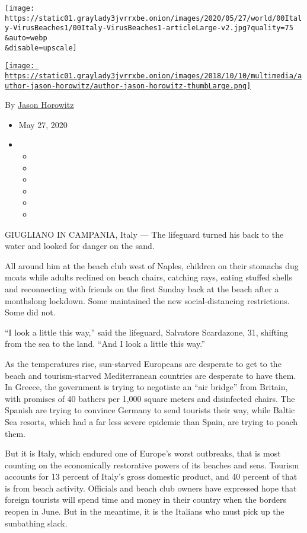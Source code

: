 \texttt{[image: https://static01.graylady3jvrrxbe.onion/images/2020/05/27/world/00Italy-VirusBeaches1/00Italy-VirusBeaches1-articleLarge-v2.jpg?quality=75\\\&auto=webp\\\&disable=upscale]}

\href{https://www.nytimes3xbfgragh.onion/by/jason-horowitz}{\texttt{[image: https://static01.graylady3jvrrxbe.onion/images/2018/10/10/multimedia/author-jason-horowitz/author-jason-horowitz-thumbLarge.png]}}

By \href{https://www.nytimes3xbfgragh.onion/by/jason-horowitz}{Jason
Horowitz}

\begin{itemize}
\item
  May 27, 2020
\item
  \begin{itemize}
  \item
  \item
  \item
  \item
  \item
  \item
  \end{itemize}
\end{itemize}

GIUGLIANO IN CAMPANIA, Italy --- The lifeguard turned his back to the
water and looked for danger on the sand.

All around him at the beach club west of Naples, children on their
stomachs dug moats while adults reclined on beach chairs, catching rays,
eating stuffed shells and reconnecting with friends on the first Sunday
back at the beach after a monthslong lockdown. Some maintained the new
social-distancing restrictions. Some did not.

``I look a little this way,'' said the lifeguard, Salvatore Scardazone,
31, shifting from the sea to the land. ``And I look a little this way.''

As the temperatures rise, sun-starved Europeans are desperate to get to
the beach and tourism-starved Mediterranean countries are desperate to
have them. In Greece, the government is trying to negotiate an ``air
bridge'' from Britain, with promises of 40 bathers per 1,000 square
meters and disinfected chairs. The Spanish are trying to convince
Germany to send tourists their way, while Baltic Sea resorts, which had
a far less severe epidemic than Spain, are trying to poach them.

But it is Italy, which endured one of Europe's worst outbreaks, that is
most counting on the economically restorative powers of its beaches and
seas. Tourism accounts for 13 percent of Italy's gross domestic product,
and 40 percent of that is from beach activity. Officials and beach club
owners have expressed hope that foreign tourists will spend time and
money in their country when the borders reopen in June. But in the
meantime, it is the Italians who must pick up the sunbathing slack.

